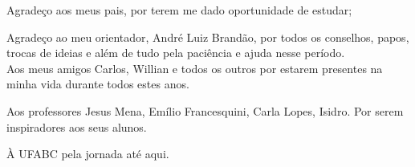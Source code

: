 \begin{agradecimentos}
\indent Agradeço aos meus pais, por terem me dado oportunidade de estudar;

\indent Agradeço ao meu orientador, André Luiz Brandão, por todos os conselhos, papos, trocas de ideias e além de tudo pela paciência e ajuda nesse período.
\\
\indent Aos meus amigos Carlos, Willian e todos os outros por estarem presentes na minha vida durante todos estes anos.

\indent Aos professores Jesus Mena, Emílio Francesquini, Carla Lopes, Isidro. Por serem inspiradores aos seus alunos.

\indent À UFABC pela jornada até aqui.

\end{agradecimentos}